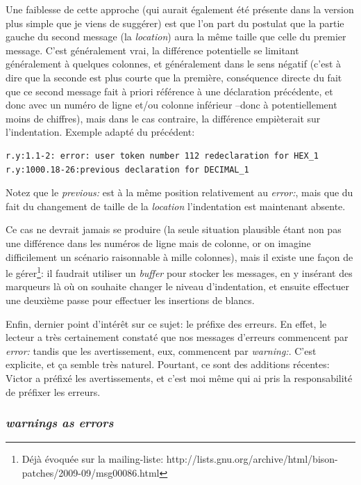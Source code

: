 \documentclass[a4paper,11pt,twoside,final]{article}
\begin{document}
  Une faiblesse de cette approche (qui aurait également été présente dans la
  version plus simple que je viens de suggérer) est que l'on part du postulat
  que la partie gauche du second message (la \textit{location}) aura la même
  taille que celle du premier message. C'est généralement vrai, la différence
  potentielle se limitant généralement à quelques colonnes, et généralement
  dans le sens négatif (c'est à dire que la seconde est plus courte que la
  première, conséquence directe du fait que ce second message fait à priori
  référence à une déclaration précédente, et donc avec un numéro de ligne et/ou
  colonne inférieur --donc à potentiellement moins de chiffres), mais dans le
  cas contraire, la différence empièterait sur l'indentation. Exemple adapté du
  précédent:

  \begin{verbatim}
r.y:1.1-2: error: user token number 112 redeclaration for HEX_1
r.y:1000.18-26:previous declaration for DECIMAL_1
  \end{verbatim}

  Notez que le \textit{previous:} est à la même position relativement au
  \textit{error:}, mais que du fait du changement de taille de la
  \textit{location} l'indentation est maintenant absente.

  Ce cas ne devrait jamais se produire (la seule situation plausible étant non
  pas une différence dans les numéros de ligne mais de colonne, or on imagine
  difficilement un scénario raisonnable à mille colonnes), mais il existe une
  façon de le gérer\footnote{Déjà évoquée sur la mailing-liste:
  http://lists.gnu.org/archive/html/bison-patches/2009-09/msg00086.html}: il
  faudrait utiliser un \textit{buffer} pour stocker les messages, en y insérant
  des marqueurs là où on souhaite changer le niveau d'indentation, et ensuite
  effectuer une deuxième passe pour effectuer les insertions de blancs.

  Enfin, dernier point d'intérêt sur ce sujet: le préfixe des erreurs. En
  effet, le lecteur a très certainement constaté que nos messages d'erreurs
  commencent par \textit{error:} tandis que les avertissement, eux, commencent
  par \textit{warning:}. C'est explicite, et ça semble très naturel. Pourtant,
  ce sont des additions récentes: Victor a préfixé les avertissements, et c'est
  moi même qui ai pris la responsabilité de préfixer les erreurs.

  \subsubsection{\textit{warnings as errors}}
\end{document}
